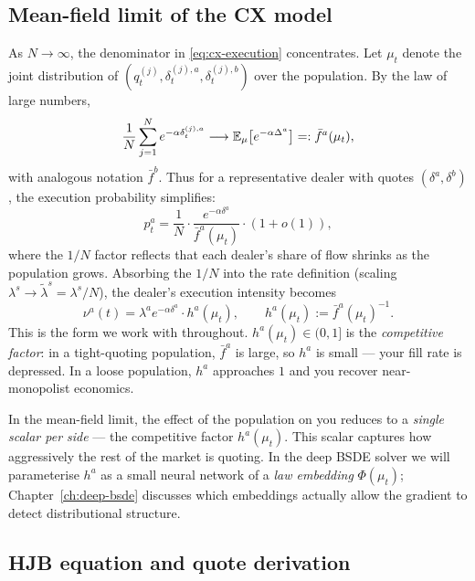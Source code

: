\subsection{Mean-field limit of the CX model}
\label{sec:mf-limit}

As $N \to \infty$, the denominator in \eqref{eq:cx-execution} concentrates. Let $\mu_t$ denote the joint distribution of $(q^{(j)}_t, \delta^{(j), a}_t, \delta^{(j), b}_t)$ over the population. By the law of large numbers,
\begin{equation}
  \frac{1}{N} \sum_{j=1}^{N} e^{-\alpha \delta^{(j), a}_t} \longrightarrow \mathbb{E}_\mu\bigl[e^{-\alpha \Delta^a}\bigr] =: \bar f^a(\mu_t),
\end{equation}
with analogous notation $\bar f^b$. Thus for a representative dealer with quotes $(\delta^a, \delta^b)$, the execution probability simplifies:
\begin{equation}
  p^a_t = \frac{1}{N} \cdot \frac{e^{-\alpha \delta^a}}{\bar f^a(\mu_t)} \cdot (1 + o(1)),
\end{equation}
where the $1/N$ factor reflects that each dealer's share of flow shrinks as the population grows. Absorbing the $1/N$ into the rate definition (scaling $\lambda^s \to \tilde \lambda^s = \lambda^s / N$), the dealer's execution intensity becomes
\begin{equation}
  \nu^a(t) = \lambda^a e^{-\alpha \delta^a} \cdot h^a(\mu_t), \qquad h^a(\mu_t) := \bar f^a(\mu_t)^{-1}.
  \label{eq:cx-mf-intensity}
\end{equation}
This is the form we work with throughout. $h^a(\mu_t) \in (0, 1]$ is the \emph{competitive factor}: in a tight-quoting population, $\bar f^a$ is large, so $h^a$ is small --- your fill rate is depressed. In a loose population, $h^a$ approaches $1$ and you recover near-monopolist economics.

\begin{intuition}
In the mean-field limit, the effect of the population on you reduces to a \emph{single scalar per side} --- the competitive factor $h^a(\mu_t)$. This scalar captures how aggressively the rest of the market is quoting. In the deep BSDE solver we will parameterise $h^a$ as a small neural network of a \emph{law embedding} $\Phi(\mu_t)$; Chapter~\ref{ch:deep-bsde} discusses which embeddings actually allow the gradient to detect distributional structure.
\end{intuition}

\subsection{HJB equation and quote derivation}

